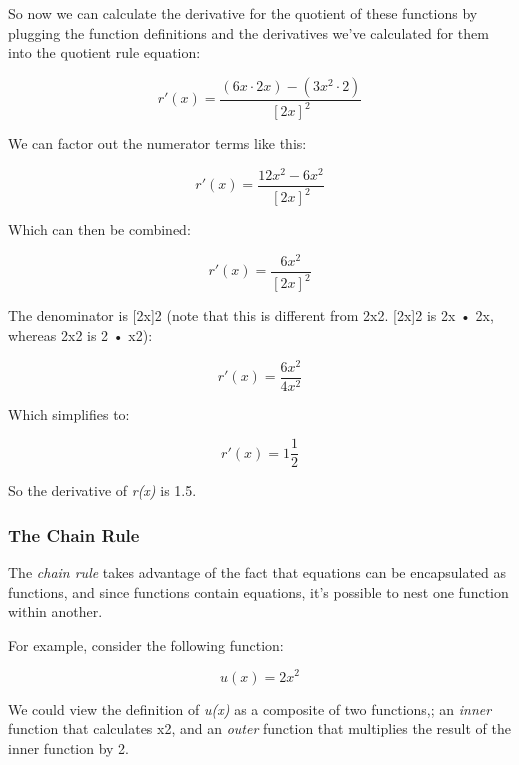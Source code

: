 \documentclass[11pt]{article}
\begin{document}
So now we can calculate the derivative for the quotient of these
functions by plugging the function definitions and the derivatives we've
calculated for them into the quotient rule equation:

\begin{equation}r'(x) = \frac{(6x \cdot 2x) - (3x^{2} \cdot 2)}{[2x]^{2}} \end{equation}

We can factor out the numerator terms like this:

\begin{equation}r'(x) = \frac{12x^{2} - 6x^{2}}{[2x]^{2}} \end{equation}

Which can then be combined:

\begin{equation}r'(x) = \frac{6x^{2}}{[2x]^{2}} \end{equation}

The denominator is {[}2x{]}2 (note that this is different from 2x2.
{[}2x{]}2 is 2x • 2x, whereas 2x2 is 2 • x2):

\begin{equation}r'(x) = \frac{6x^{2}}{4x^{2}} \end{equation}

Which simplifies to:

\begin{equation}r'(x) = 1\frac{1}{2} \end{equation}

So the derivative of \emph{r(x)} is 1.5.

    \subsubsection{The Chain Rule}\label{the-chain-rule}

The \emph{chain rule} takes advantage of the fact that equations can be
encapsulated as functions, and since functions contain equations, it's
possible to nest one function within another.

For example, consider the following function:

\begin{equation}u(x) = 2x^{2} \end{equation}

We could view the definition of \emph{u(x)} as a composite of two
functions,; an \emph{inner} function that calculates x2, and an
\emph{outer} function that multiplies the result of the inner function
by 2.
\end{document}
